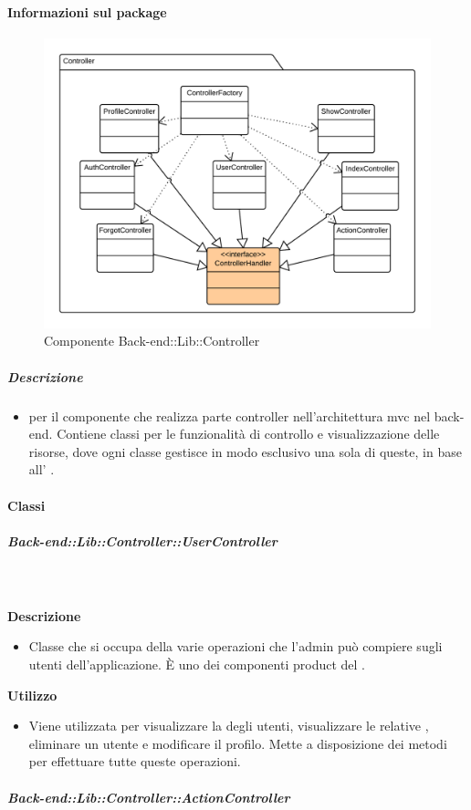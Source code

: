   \paragraph{Informazioni sul package} 
    \begin{figure}[H] 
      \begin{center} 
        \includegraphics[width=\textwidth]{packages/Back-end::Lib::Controller.png}  
        \caption{Componente Back-end::Lib::Controller}
      \end{center}  
    \end{figure} 
  \subparagraph{Descrizione} 
    \begin{itemize}
    \item[]  per il componente che realizza parte controller nell'architettura mvc nel back-end. Contiene classi per le funzionalità di controllo e visualizzazione delle risorse, dove ogni classe gestisce in modo esclusivo una sola di queste, in base all' .
    \end{itemize} 
    \paragraph{Classi}
      \subparagraph{Back-end::Lib::Controller::UserController}
        
        \textbf{\\ \\ Descrizione} 
          \begin{itemize}
            \item[] Classe che si occupa della varie operazioni che l'admin può compiere sugli utenti dell'applicazione. È uno dei componenti product del  .
          \end{itemize}      
        \textbf{Utilizzo}  
          \begin{itemize}
            \item[] Viene utilizzata per visualizzare la  degli utenti, visualizzare le relative , eliminare un utente e modificare il profilo. Mette a disposizione dei metodi per effettuare tutte queste operazioni.
          \end{itemize}
      \subparagraph{Back-end::Lib::Controller::ActionController}
        

